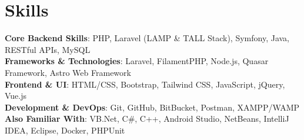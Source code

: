 \documentclass[legal,10pt]{article}
\newcommand{\resumeItem}[1]{
  \item\small{
    {#1 \vspace{-2pt}}
  }
}
\newcommand{\resumeItemListStart}{\begin{itemize}}
\newcommand{\resumeItemListEnd}{\end{itemize}\vspace{-5pt}}
\begin{document}
\section{Skills}
\begin{itemize}[leftmargin=0.15in, label={}]
    \small{\item{
     \textbf{Core Backend Skills}{: PHP, Laravel (LAMP \& TALL Stack), Symfony, Java, RESTful APIs, MySQL} \\
     \textbf{Frameworks \& Technologies}{: Laravel, FilamentPHP, Node.js, Quasar Framework, Astro Web Framework} \\
     \textbf{Frontend \& UI}{: HTML/CSS, Bootstrap, Tailwind CSS, JavaScript, jQuery, Vue.js} \\
     \textbf{Development \& DevOps}{: Git, GitHub, BitBucket, Postman, XAMPP/WAMP} \\
     \textbf{Also Familiar With}{: VB.Net, C\#, C++, Android Studio, NetBeans, IntelliJ IDEA, Eclipse, Docker, PHPUnit} \\
    }}
\end{itemize}

\end{document}
